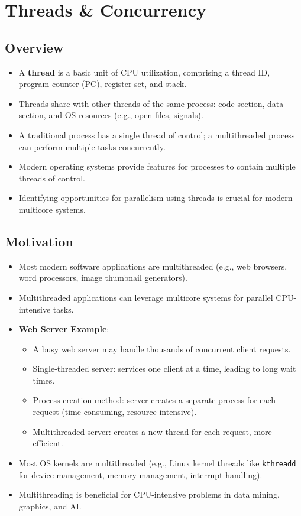 \section{Threads \& Concurrency}\label{sec:4.1}

\subsection{Overview}
\begin{itemize}
    \item A \textbf{thread} is a basic unit of CPU utilization, comprising a thread ID, program counter (PC), register set, and stack.
    \item Threads share with other threads of the same process: code section, data section, and OS resources (e.g., open files, signals).
    \item A traditional process has a single thread of control; a multithreaded process can perform multiple tasks concurrently.
    \item Modern operating systems provide features for processes to contain multiple threads of control.
    \item Identifying opportunities for parallelism using threads is crucial for modern multicore systems.
\end{itemize}

\subsection{Motivation}
\begin{itemize}
    \item Most modern software applications are multithreaded (e.g., web browsers, word processors, image thumbnail generators).
    \item Multithreaded applications can leverage multicore systems for parallel CPU-intensive tasks.
    \item \textbf{Web Server Example}:
        \begin{itemize}
            \item A busy web server may handle thousands of concurrent client requests.
            \item Single-threaded server: services one client at a time, leading to long wait times.
            \item Process-creation method: server creates a separate process for each request (time-consuming, resource-intensive).
            \item Multithreaded server: creates a new thread for each request, more efficient.
        \end{itemize}
    \item Most OS kernels are multithreaded (e.g., Linux kernel threads like \texttt{kthreadd} for device management, memory management, interrupt handling).
    \item Multithreading is beneficial for CPU-intensive problems in data mining, graphics, and AI.
\end{itemize}

